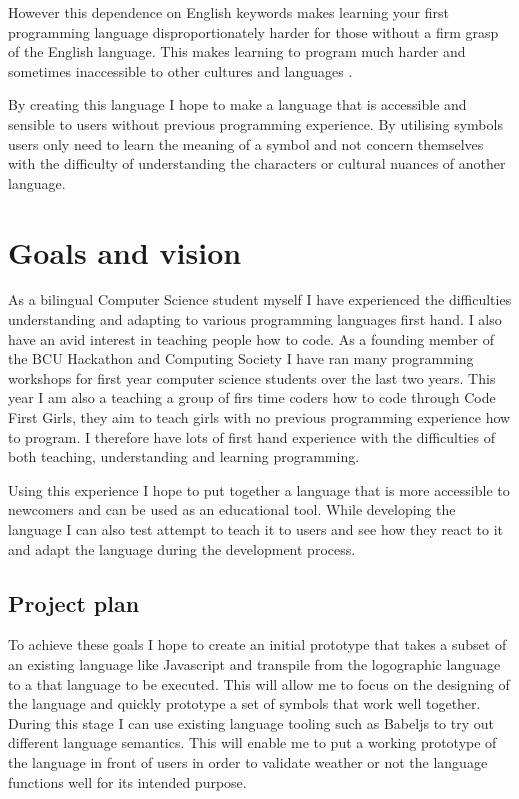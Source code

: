 \documentclass[12pt]{article}
\begin{document}
However this dependence on English keywords makes learning your first programming language disproportionately harder
for those without a firm grasp of the English language. This makes learning to program much harder and sometimes
inaccessible to other cultures and languages \parencite{7026875}. 

By creating this language I hope to make a language that is accessible and sensible to users without previous
programming experience. By utilising symbols users only need to learn the meaning of a symbol and not concern themselves
with the difficulty of understanding the characters or cultural nuances \parencite{Eastman:1982:CEN:358728.358756} of another language.


\section{Goals and vision}

As a bilingual Computer Science student myself I have experienced the difficulties understanding and adapting to various programming
languages first hand. I also have an avid interest in teaching people how to code. As a founding member of the BCU Hackathon and Computing Society \parencite{noauthor_hacs_nodate}
I have ran many programming workshops for first year computer science students over the last two years. This year I am also a teaching a group of firs time coders
how to code through Code First Girls\parencite{noauthor_code_nodate},
they aim to teach girls with no previous programming experience how to program. I therefore have lots of first hand experience with the
difficulties of both teaching, understanding and learning programming.

Using this experience I hope to put together a language that is more accessible to newcomers and can be used as an educational tool.
While developing the language I can also test attempt to teach it to users and see how they react to it and adapt the language during the development process.

\subsection{Project plan}

To achieve these goals I hope to create an initial prototype that takes a subset of an existing language like Javascript and transpile from the logographic 
language to a that language to be executed. This will allow me to focus on the designing of the language and quickly prototype a set of symbols that work well together.
During this stage I can use existing language tooling such as Babeljs \parencite{noauthor_babel_nodate} to try out different language semantics. This will enable me to put a working prototype of the language in front of
users in order to validate weather or not the language functions well for its intended purpose.
\end{document}
